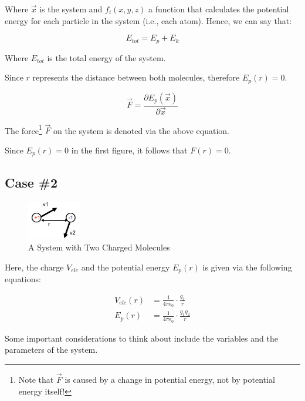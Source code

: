 \documentclass[
  letterpaper,
  DIV=11,
  numbers=noendperiod]{scrreprt}
\begin{document}
Where \(\vec{x}\) is the system and \(f_i(x, y, z)\) a function that
calculates the potential energy for each particle in the system (i.e.,
each atom). Hence, we can say that:

\begin{equation}
  E_{tot} = E_p + E_k
\end{equation}

Where \(E_{tot}\) is the total energy of the system.

Since \(r\) represents the distance between both molecules, therefore
\(E_p(r) = 0\).

\begin{equation}
  \vec{F} = \frac{\partial E_p(\vec{x})}{\partial \vec{x}}
\end{equation}

The force\footnote{Note that \(\vec{F}\) is caused by a change in
  potential energy, not by potential energy itself!} \(\vec{F}\) on the
system is denoted via the above equation.

Since \(E_p(r) = 0\) in the first figure, it follows that \(F(r) = 0\).

\hypertarget{case-2}{%
\subsection{Case \#2}\label{case-2}}

\begin{figure}

{\centering \includegraphics[width=0.92in,height=\textheight]{./images/wk1/sys2.jpg}

}

\caption{A System with Two Charged Molecules}

\end{figure}

Here, the charge \(V_{ele}\) and the potential energy \(E_p(r)\) is
given via the following equations:

\begin{align}
  V_{ele}(r) &= \frac{1}{4\pi \epsilon_0} \cdot \frac{q_1}{r} \\ 
  E_p(r) &= \frac{1}{4\pi \epsilon_0} \cdot \frac{q_1q_2}{r}
\end{align}

Some important considerations to think about include the variables and
the parameters of the system.
\end{document}
